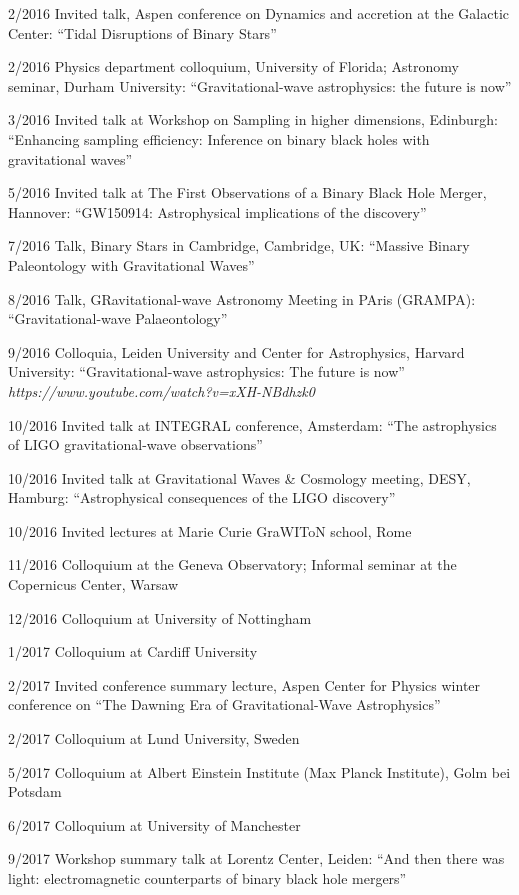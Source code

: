\documentclass[margin,line]{res}
\begin{document}
\begin{resume}
2/2016 	Invited talk, Aspen conference on Dynamics and accretion at the Galactic Center: ``Tidal Disruptions of Binary Stars''

2/2016	Physics department colloquium, University of Florida;  Astronomy seminar, Durham University: ``Gravitational-wave astrophysics: the future is now''

3/2016	Invited talk at Workshop on Sampling in higher dimensions, Edinburgh: ``Enhancing sampling efficiency: Inference on binary black holes with gravitational waves''

5/2016 	Invited talk at The First Observations of a Binary Black Hole Merger, Hannover: ``GW150914: Astrophysical implications of the discovery''

7/2016	Talk, Binary Stars in Cambridge, Cambridge, UK: ``Massive Binary Paleontology with Gravitational Waves''

8/2016 	Talk, GRavitational-wave Astronomy Meeting in PAris (GRAMPA): ``Gravitational-wave Palaeontology''

9/2016 	Colloquia, Leiden University and Center for Astrophysics, Harvard University: ``Gravitational-wave astrophysics: The future is now'' {\it https://www.youtube.com/watch?v=xXH-NBdhzk0}

10/2016 	Invited talk at INTEGRAL conference, Amsterdam: ``The astrophysics of LIGO gravitational-wave observations''

10/2016 	Invited talk at Gravitational Waves \& Cosmology meeting, DESY, Hamburg:  ``Astrophysical consequences of the LIGO discovery''

10/2016 	Invited lectures at Marie Curie GraWIToN school, Rome

11/2016 	Colloquium at the Geneva Observatory; Informal seminar at the Copernicus Center, Warsaw 

12/2016 	Colloquium at University of Nottingham

1/2017 	Colloquium at Cardiff University

2/2017	Invited conference summary lecture, Aspen Center for Physics winter conference on ``The Dawning Era of Gravitational-Wave Astrophysics''

2/2017	Colloquium at Lund University, Sweden 

5/2017	Colloquium at Albert Einstein Institute (Max Planck Institute), Golm bei Potsdam

6/2017 	Colloquium at University of Manchester

9/2017	Workshop summary talk at Lorentz Center, Leiden: ``And then there was light: electromagnetic counterparts of binary black hole mergers''


\end{resume}
\end{document}

